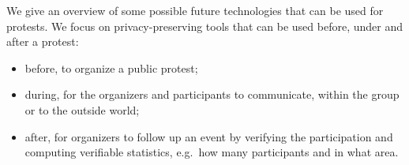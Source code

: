 We give an overview of some possible future technologies that can be used for 
protests.
We focus on privacy-preserving tools that can be used before, under and after 
a protest:
\begin{itemize}
  \item before, to organize a public protest;
  \item during, for the organizers and participants to communicate, within 
    the group or to the outside world;
  \item after, for organizers to follow up an event by verifying the participation 
    and computing verifiable statistics, e.g.\ how many participants and in 
    what area.
\end{itemize}

